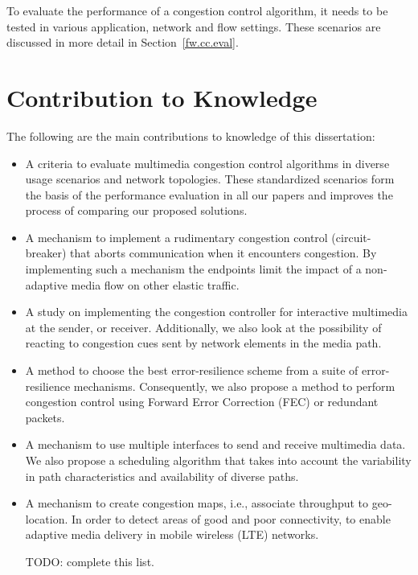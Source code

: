 To evaluate the performance of a congestion control algorithm, it needs to be
tested in various application, network and flow settings. These scenarios
are discussed in more detail in Section~\ref{fw.cc.eval}.

\section{Contribution to Knowledge}

The following are the main contributions to knowledge of this dissertation:

\begin{itemize}

\item A criteria to evaluate multimedia congestion control algorithms in
diverse usage scenarios and network topologies. These standardized scenarios
form the basis of the performance evaluation in all our papers and improves
the process of comparing our proposed solutions.

\item A mechanism to implement a rudimentary congestion control (circuit-
breaker) that aborts communication when it encounters congestion. By
implementing such a mechanism the endpoints limit the impact of a non-adaptive
media flow on other elastic traffic.

\item A study on implementing the congestion controller for interactive
multimedia at the sender, or receiver.  Additionally, we also look at the
possibility of reacting to congestion cues sent by network elements in the
media path.

\item A method to choose the best error-resilience scheme from a suite of
error-resilience mechanisms. Consequently, we also propose a method to perform
congestion control using Forward Error Correction (FEC) or redundant packets.

\item A mechanism to use multiple interfaces to send and receive multimedia
data. We also propose a scheduling algorithm that takes into account the
variability in path characteristics and availability of diverse paths. 

\item A mechanism to create congestion maps, i.e., associate throughput to 
geo-location. In order to detect areas of good and poor connectivity, to 
enable adaptive media delivery in mobile wireless (LTE) networks.

{\color{red} TODO: complete this list.}

\end{itemize}